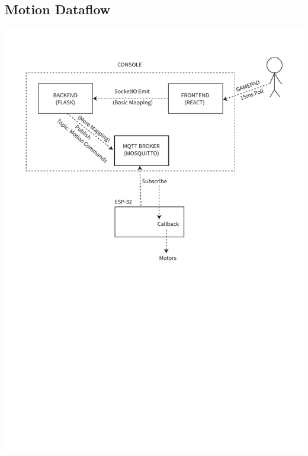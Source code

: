\documentclass[a4paper,12pt]{article}
\begin{document}
\subsection{Motion Dataflow} \label{motflow}
\includegraphics[trim=40 380 0 57,scale=0.95,clip]{media/mot.pdf}
\end{document}
